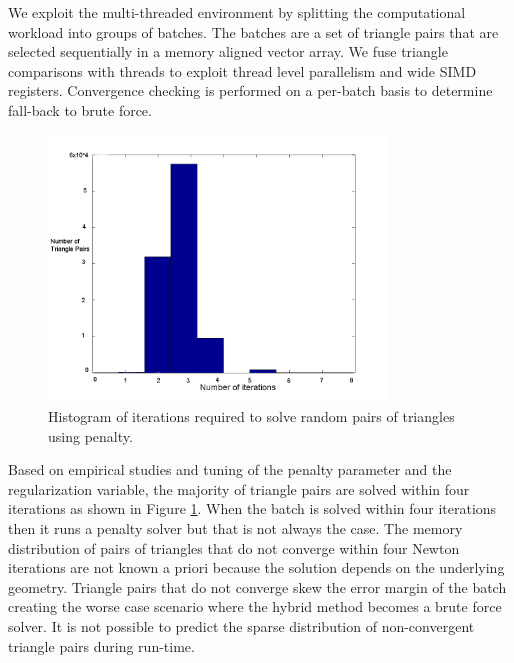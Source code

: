 \documentclass[times,12pt]{article}
\begin{document}
We exploit the multi-threaded environment by splitting the computational workload into groups of batches. The batches are a set of triangle pairs that are selected sequentially in a memory aligned vector array. We fuse triangle comparisons with threads to exploit thread level parallelism and wide SIMD registers. Convergence checking is performed on a per-batch basis to determine fall-back to brute force. 

\begin{figure}[!h]
\centering
\includegraphics[width=0.8\textwidth]{hist} \protect\caption{\label{fig3}Histogram of iterations required to solve random pairs of triangles using penalty.}
\end{figure}

Based on empirical studies and tuning of the penalty parameter and the regularization variable, the majority of triangle pairs are solved within four iterations as shown in Figure \ref{fig3}. When the batch is solved within four iterations then it runs a penalty solver but that is not always the case. The memory distribution of pairs of triangles that do not converge within four Newton iterations are not known a priori because the solution depends on the underlying geometry. Triangle pairs that do not converge skew the error margin of the batch creating the worse case scenario where the hybrid method becomes a brute force solver. It is not possible to predict the sparse distribution of non-convergent triangle pairs during run-time.
\end{document}
